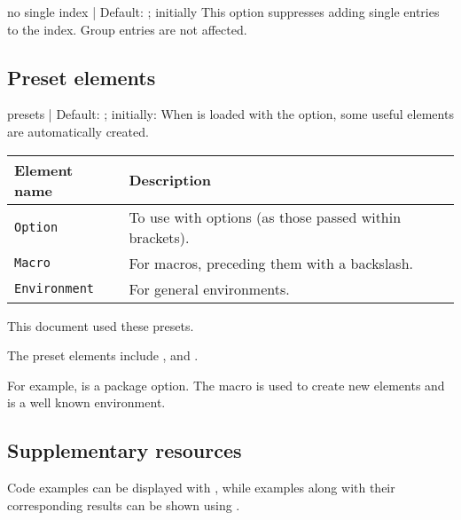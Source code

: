 \documentclass[11pt, outdir = ./out]{article}
\begin{document}
\begin{Optiondef}{no single index}{ | }{Default: ; initially }
    This option suppresses adding single entries to the index. Group entries are not affected.
\end{Optiondef}

\subsection{Preset elements}\label{sec:preset-elements}


\begin{Optiondef}{presets}{ | }{Default: ; initially: }
    When  is loaded with the  option, some useful elements are automatically created.

    \bigskip
    \begin{tabular}{ll}
        \textbf{Element name} & \textbf{Description}                                   \\
        \hline
        \texttt{Option}       & To use with options (as those passed within brackets). \\
        \texttt{Macro}        & For macros, preceding them with a backslash.           \\
        \texttt{Environment}  & For general environments.                              \\
    \end{tabular}

    \bigskip
    This document used these presets.
\end{Optiondef}


\begin{DocsExample}
    The preset elements include ,  and .

    For example,  is a package option. The  macro is used to create new elements and  is a well known environment.
\end{DocsExample}

\subsection{Supplementary resources}

Code examples can be displayed with , while examples along with their corresponding results can be shown using .
\end{document}

